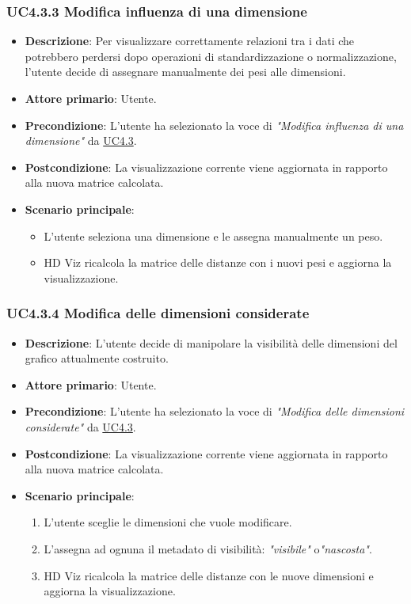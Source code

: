 \subsubsection{UC4.3.3 Modifica influenza di una dimensione}
\label{ssub:uc4.3.3}
\begin{itemize}
    \item \textbf{Descrizione}: Per visualizzare correttamente relazioni tra i dati che 
                                potrebbero perdersi dopo operazioni di standardizzazione o normalizzazione,
                                l’utente decide di assegnare manualmente dei pesi alle dimensioni.

    \item \textbf{Attore primario}: Utente.
    \item \textbf{Precondizione}: L'utente ha selezionato la voce di \emph{"Modifica influenza di una dimensione"} da \hyperref[ssub:uc4.3]{UC4.3}.

    \item \textbf{Postcondizione}: La visualizzazione corrente viene aggiornata in rapporto alla nuova matrice calcolata.
    \item \textbf{Scenario principale}:  
    \begin{itemize}
        \item L’utente seleziona una dimensione e le assegna manualmente un peso.
        \item HD Viz ricalcola la matrice delle distanze con i nuovi pesi e aggiorna la visualizzazione.
    \end{itemize}
\end{itemize}

\subsubsection{UC4.3.4 Modifica delle dimensioni considerate}
\label{ssub:uc4.3.4}
\begin{itemize}
    \item \textbf{Descrizione}: L'utente decide di manipolare la visibilità delle dimensioni 
                                del grafico attualmente costruito.
    \item \textbf{Attore primario}: Utente.
    \item \textbf{Precondizione}: L'utente ha selezionato la voce di \emph{"Modifica delle dimensioni considerate"} da \hyperref[ssub:uc4.3]{UC4.3}.
    \item \textbf{Postcondizione}: La visualizzazione corrente viene aggiornata in rapporto alla nuova matrice calcolata.
    \item \textbf{Scenario principale}:
    \begin{enumerate}
        \item L'utente sceglie le dimensioni che vuole modificare. 
        \item L'assegna ad ognuna il metadato di visibilità: \emph{"visibile"} o\emph{"nascosta"}.
        \item HD Viz ricalcola la matrice delle distanze con le nuove dimensioni e aggiorna la visualizzazione.
    \end{enumerate}
\end{itemize}

